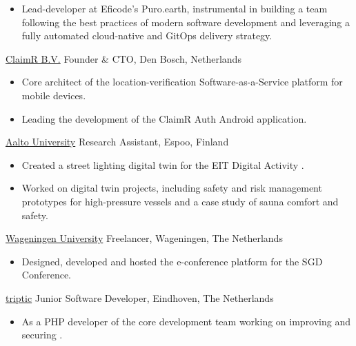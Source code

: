 {{\begin{itemize}[leftmargin=0.6cm, label={\textbullet}]
 		\item Lead-developer at Eficode's {} Puro.earth, instrumental in building a team following the best practices of modern software development and leveraging a fully automated cloud-native and GitOps delivery strategy.
 	\end{itemize}
 }
  
 {{\color{blue}\href{https://claimr.tools}{ClaimR B.V.}}}
 {Founder \& CTO,}
 {Den Bosch, Netherlands}
 {}{}
 {
 	\begin{itemize}[leftmargin=0.6cm, label={\textbullet}]
 		\item Core architect of the {} location-verification Software-as-a-Service platform for mobile devices. 
 		\item Leading the development of the ClaimR Auth Android application.
 	\end{itemize}
 }
  
  
 {{\color{blue}\href{https://www.aalto.fi/en}{Aalto University}}}
 {Research Assistant,}
 {Espoo, Finland}
 {}{}
 {
 	\begin{itemize}[leftmargin=0.6cm, label={\textbullet}]
 		\item Created a street lighting digital twin for the EIT Digital Activity .
 		\item Worked on digital twin projects, including safety and risk management prototypes for high-pressure vessels and a case study of sauna comfort and safety.
 	\end{itemize}
 }
  
 {{\color{blue}\href{https://wur.nl/en}{Wageningen University}}}
 {Freelancer,}
 {Wageningen, The Netherlands}
 {}{}
 {
 	\begin{itemize}[leftmargin=0.6cm, label={\textbullet}]
 		\item Designed, developed and hosted the e-conference platform  for the SGD Conference.
 	\end{itemize}
 }
  
 {{\color{blue}\href{https://www.triptic.nl/}{triptic}}}
 {Junior Software Developer,}
 {Eindhoven, The Netherlands}
 {}{}
 {
 	\begin{itemize}[leftmargin=0.6cm, label={\textbullet}]
 		\item As a PHP developer of the core development team working on improving and securing .
 	\end{itemize}
 }
}


